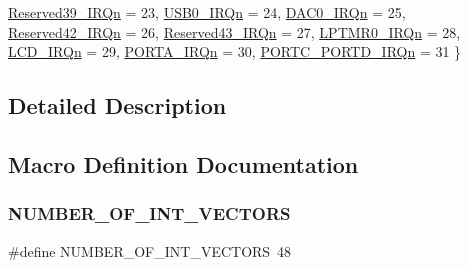 \begin{DoxyCompactItemize}
\mbox{\hyperlink{group___interrupt__vector__numbers_gga666eb0caeb12ec0e281415592ae89083a90e384732cd8a5ea37e04672d27e821e}{Reserved39\+\_\+\+I\+R\+Qn}} = 23, 
\mbox{\hyperlink{group___interrupt__vector__numbers_gga666eb0caeb12ec0e281415592ae89083ad85ea858fda8e15398b5aa74c019cb7a}{U\+S\+B0\+\_\+\+I\+R\+Qn}} = 24, 
\mbox{\hyperlink{group___interrupt__vector__numbers_gga666eb0caeb12ec0e281415592ae89083a6029e7bffa10f584e060a5448a456927}{D\+A\+C0\+\_\+\+I\+R\+Qn}} = 25, 
\newline
\mbox{\hyperlink{group___interrupt__vector__numbers_gga666eb0caeb12ec0e281415592ae89083add4da009a546c07b4dd20a10d01f47f1}{Reserved42\+\_\+\+I\+R\+Qn}} = 26, 
\mbox{\hyperlink{group___interrupt__vector__numbers_gga666eb0caeb12ec0e281415592ae89083aecd55d0e1e8cbb157482bcfee62ca6ce}{Reserved43\+\_\+\+I\+R\+Qn}} = 27, 
\mbox{\hyperlink{group___interrupt__vector__numbers_gga666eb0caeb12ec0e281415592ae89083a93853a8a41060ac37aa92ae9ee472c6e}{L\+P\+T\+M\+R0\+\_\+\+I\+R\+Qn}} = 28, 
\mbox{\hyperlink{group___interrupt__vector__numbers_gga666eb0caeb12ec0e281415592ae89083a161916b33cc34138d17e57eaa8464568}{L\+C\+D\+\_\+\+I\+R\+Qn}} = 29, 
\newline
\mbox{\hyperlink{group___interrupt__vector__numbers_gga666eb0caeb12ec0e281415592ae89083ab9d085b02f1b3c2ed7b0b7fe6ae4c947}{P\+O\+R\+T\+A\+\_\+\+I\+R\+Qn}} = 30, 
\mbox{\hyperlink{group___interrupt__vector__numbers_gga666eb0caeb12ec0e281415592ae89083ae07c0b38885bc05763138de5d5198fa4}{P\+O\+R\+T\+C\+\_\+\+P\+O\+R\+T\+D\+\_\+\+I\+R\+Qn}} = 31
 \}
\end{DoxyCompactItemize}


\subsection{Detailed Description}


\subsection{Macro Definition Documentation}
\mbox{\label{group___interrupt__vector__numbers_gafe46d81f4fa2c4f6ed1361f24f046fa8}} 
\subsubsection{\texorpdfstring{NUMBER\_OF\_INT\_VECTORS}{NUMBER\_OF\_INT\_VECTORS}}
{\footnotesize\ttfamily \#define N\+U\+M\+B\+E\+R\+\_\+\+O\+F\+\_\+\+I\+N\+T\+\_\+\+V\+E\+C\+T\+O\+RS~48}

